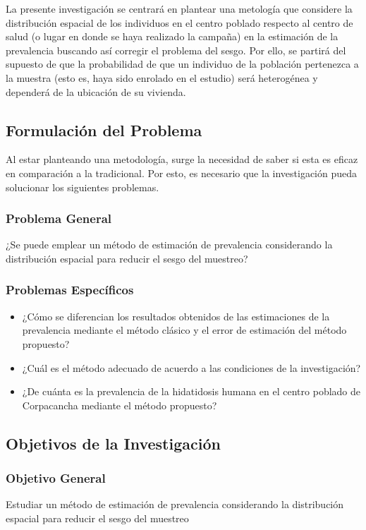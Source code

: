 La presente investigación se centrará en plantear una metología que considere la distribución espacial de los individuos en el centro poblado respecto al centro de salud (o lugar en donde se haya realizado la campaña) en la estimación de la prevalencia buscando así corregir el problema del sesgo. Por ello, se partirá del supuesto de que la probabilidad de que un individuo de la población pertenezca a la muestra (esto es, haya sido enrolado en el estudio) será heterogénea y dependerá de la ubicación de su vivienda.


\newpage
\subsection{Formulación del Problema}
Al estar planteando una metodología, surge la necesidad de saber si esta es eficaz en comparación a la tradicional. Por esto, es necesario que la investigación pueda solucionar los siguientes problemas.
\subsubsection{Problema General}
¿Se puede emplear un método de estimación de prevalencia considerando la distribución espacial para reducir el sesgo del muestreo?
\subsubsection{Problemas Específicos}
\begin{itemize}
    \item ¿Cómo se diferencian los resultados obtenidos de las estimaciones de la prevalencia mediante el método clásico y el error de estimación del método propuesto?
    \item ¿Cuál es el método adecuado de acuerdo a las condiciones de la investigación?
    \item ¿De cuánta es la prevalencia de la hidatidosis humana en el centro poblado de Corpacancha mediante el método propuesto?
\end{itemize}
\subsection{Objetivos de la Investigación}
\subsubsection{Objetivo General}
Estudiar un método de estimación de prevalencia considerando la distribución espacial para reducir el sesgo del muestreo
